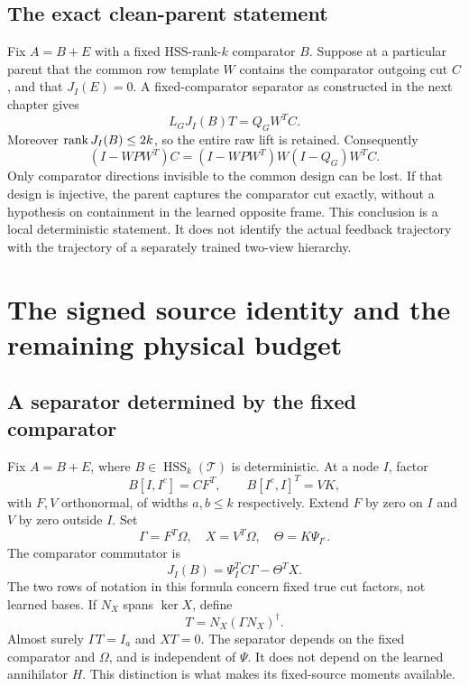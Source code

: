 \documentclass[11pt,oneside,openany,a4paper]{report}
\numberwithin{equation}{chapter}
\theoremstyle{definition}
\theoremstyle{remark}
\DeclareMathOperator{\HSS}{HSS}\DeclareMathOperator{\dist}{dist}
\begin{document}
\section{The exact clean-parent statement}

Fix $A=B+E$ with a fixed HSS-rank-$k$ comparator $B$.  Suppose at a
particular parent that the common row template $W$ contains the
comparator outgoing cut $C$, and that $J_I(E)=0$.  A fixed-comparator
separator as constructed in the next chapter gives
\[
 L_GJ_I(B)T=Q_GW^TC.
\]
Moreover $\operatorname{rank} J_I(B)\leq2k$, so the entire raw lift is retained.
Consequently
\begin{equation}
 (I-WPW^T)C
   =(I-WPW^T)W(I-Q_G)W^TC.
 \label{eq:route-clean-invisible}
\end{equation}
Only comparator directions invisible to the common design can be lost.
If that design is injective, the parent captures the comparator cut
exactly, without a hypothesis on containment in the learned opposite
frame.  This conclusion is a local deterministic statement.  It does
not identify the actual feedback trajectory with the trajectory of a
separately trained two-view hierarchy.

\chapter{The signed source identity and the remaining physical budget}
\label{chap:route-signed}

\section{A separator determined by the fixed comparator}

Fix $A=B+E$, where $B\in\HSS_k(\mathcal T)$ is deterministic.  At a
node $I$, factor
\[
 B[I,I^c]=CF^T,\qquad B[I^c,I]^T=VK,
\]
with $F,V$ orthonormal, of widths $a,b\leq k$ respectively.  Extend
$F$ by zero on $I$ and $V$ by zero outside $I$.  Set
\[
 \Gamma=F^T\Omega,\quad X=V^T\Omega,\quad
 \Theta=K\Psi_{I^c}.
\]
The comparator commutator is
\begin{equation}
 J_I(B)=\Psi_I^TC\Gamma-\Theta^TX.
 \label{eq:route-comparator-J}
\end{equation}
The two rows of notation in this formula concern fixed true cut
factors, not learned bases.  If $N_X$ spans $\ker X$, define
\begin{equation}
 T=N_X(\Gamma N_X)^\dagger.
 \label{eq:route-separator}
\end{equation}
Almost surely $\Gamma T=I_a$ and $XT=0$.  The separator depends on the
fixed comparator and $\Omega$, and is independent of $\Psi$.  It does
not depend on the learned annihilator $H$.  This distinction is what
makes its fixed-source moments available.
\end{document}

